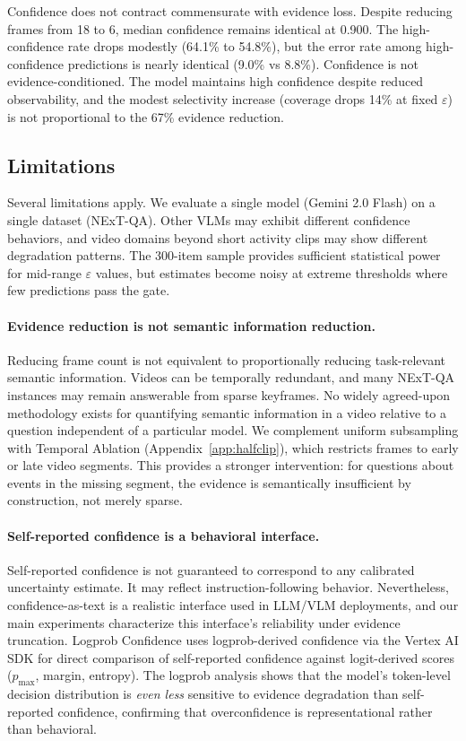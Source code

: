 \documentclass{article}
\begin{document}
Confidence does not contract commensurate with evidence loss. Despite reducing frames from 18 to 6, median confidence remains identical at 0.900. The high-confidence rate drops modestly (64.1\% to 54.8\%), but the error rate among high-confidence predictions is nearly identical (9.0\% vs 8.8\%). Confidence is not evidence-conditioned. The model maintains high confidence despite reduced observability, and the modest selectivity increase (coverage drops 14\% at fixed $\varepsilon$) is not proportional to the 67\% evidence reduction.

\subsection{Limitations}

Several limitations apply. We evaluate a single model (Gemini 2.0 Flash) on a single dataset (NExT-QA). Other VLMs may exhibit different confidence behaviors, and video domains beyond short activity clips may show different degradation patterns. The 300-item sample provides sufficient statistical power for mid-range $\varepsilon$ values, but estimates become noisy at extreme thresholds where few predictions pass the gate.

\paragraph{Evidence reduction is not semantic information reduction.}
Reducing frame count is not equivalent to proportionally reducing task-relevant semantic information. Videos can be temporally redundant, and many NExT-QA instances may remain answerable from sparse keyframes. No widely agreed-upon methodology exists for quantifying semantic information in a video relative to a question independent of a particular model. We complement uniform subsampling with Temporal Ablation (Appendix~\ref{app:halfclip}), which restricts frames to early or late video segments. This provides a stronger intervention: for questions about events in the missing segment, the evidence is semantically insufficient by construction, not merely sparse.

\paragraph{Self-reported confidence is a behavioral interface.}
Self-reported confidence is not guaranteed to correspond to any calibrated uncertainty estimate. It may reflect instruction-following behavior. Nevertheless, confidence-as-text is a realistic interface used in LLM/VLM deployments, and our main experiments characterize this interface's reliability under evidence truncation. Logprob Confidence uses logprob-derived confidence via the Vertex AI SDK for direct comparison of self-reported confidence against logit-derived scores ($p_{\max}$, margin, entropy). The logprob analysis shows that the model's token-level decision distribution is \emph{even less} sensitive to evidence degradation than self-reported confidence, confirming that overconfidence is representational rather than behavioral.
\end{document}
